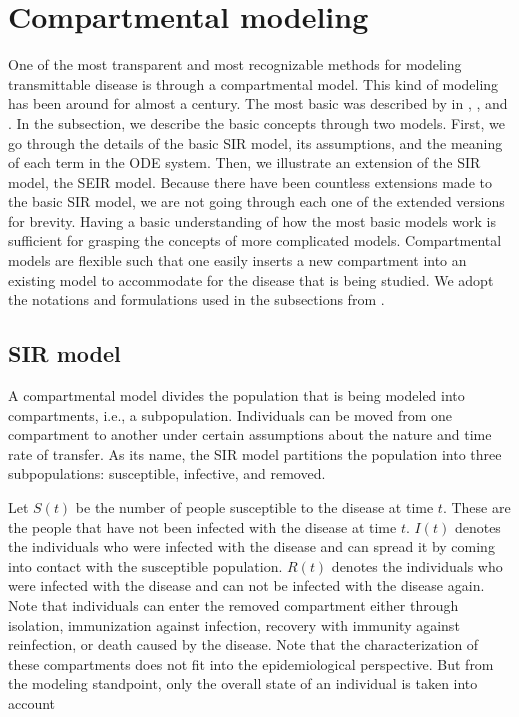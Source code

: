 \section{Compartmental modeling}
\label{sec:literature-review-compartmental-modeling}

One of the most transparent and most recognizable methods for modeling transmittable disease is through a compartmental model.
This kind of modeling has been around for almost a century.
The most basic was described by \citeauthor{kermackContributionMathematicalTheory1927} in \citeyear{kermackContributionMathematicalTheory1927}, \citeyear{kermackContributionsMathematicalTheory1932}, and \citeyear{ kermackContributionsMathematicalTheory1933} \cite{kermackContributionMathematicalTheory1927, kermackContributionsMathematicalTheory1932, kermackContributionsMathematicalTheory1933}.
In the subsection, we describe the basic concepts through two models.
First, we go through the details of the basic \gls{SIR} model, its assumptions, and the meaning of each term in the \gls{ODE} system.
Then, we illustrate an extension of the \gls{SIR} model, the \gls{SEIR} model.
Because there have been countless extensions made to the basic \gls{SIR} model, we are not going through each one of the extended versions for brevity.
Having a basic understanding of how the most basic models work is sufficient for grasping the concepts of more complicated models.
Compartmental models are flexible such that one easily inserts a new compartment into an existing model to accommodate for the disease that is being studied.
We adopt the notations and formulations used in the subsections from \citeauthor{brauerCompartmentalModelsEpidemiology2008} \cite{brauerCompartmentalModelsEpidemiology2008}.

\subsection{SIR model}

A compartmental model divides the population that is being modeled into compartments, i.e., a subpopulation.
Individuals can be moved from one compartment to another under certain assumptions about the nature and time rate of transfer.
As its name, the \gls{SIR} model partitions the population into three subpopulations: susceptible, infective, and removed.

Let $S(t)$ be the number of people susceptible to the disease at time $t$.
These are the people that have not been infected with the disease at time $t$.
$I(t)$ denotes the individuals who were infected with the disease and can spread it by coming into contact with the susceptible population.
$R(t)$ denotes the individuals who were infected with the disease and can not be infected with the disease again.
Note that individuals can enter the removed compartment either through isolation, immunization against infection, recovery with immunity against reinfection, or death caused by the disease.
Note that the characterization of these compartments does not fit into the epidemiological perspective.
But from the modeling standpoint, only the overall state of an individual is taken into account

